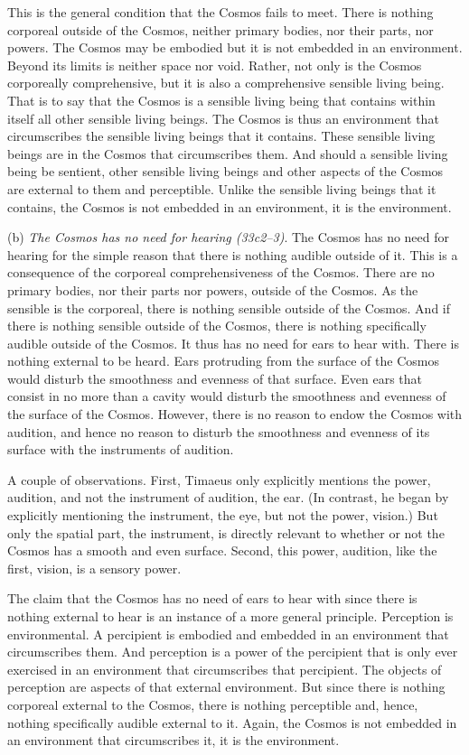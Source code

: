 This is the general condition that the Cosmos fails to meet. There is nothing corporeal outside of the Cosmos, neither primary bodies, nor their parts, nor powers. The Cosmos may be embodied but it is not embedded in an environment. Beyond its limits is neither space nor void. Rather, not only is the Cosmos corporeally comprehensive, but it is also a comprehensive sensible living being. That is to say that the Cosmos is a sensible living being that contains within itself all other sensible living beings. The Cosmos is thus an environment that circumscribes the sensible living beings that it contains. These sensible living beings are in the Cosmos that circumscribes them. And should a sensible living being be sentient, other sensible living beings and other aspects of the Cosmos are external to them and perceptible. Unlike the sensible living beings that it contains, the Cosmos is not embedded in an environment, it is the environment.

(b) \emph{The Cosmos has no need for hearing (33c2–3)}. The Cosmos has no need for hearing for the simple reason that there is nothing audible outside of it. This is a consequence of the corporeal comprehensiveness of the Cosmos. There are no primary bodies, nor their parts nor powers, outside of the Cosmos. As the sensible is the corporeal, there is nothing sensible outside of the Cosmos. And if there is nothing sensible outside of the Cosmos, there is nothing specifically audible outside of the Cosmos. It thus has no need for ears to hear with. There is nothing external to be heard. Ears protruding from the surface of the Cosmos would disturb the smoothness and evenness of that surface. Even ears that consist in no more than a cavity would disturb the smoothness and evenness of the surface of the Cosmos. However, there is no reason to endow the Cosmos with audition, and hence no reason to disturb the smoothness and evenness of its surface with the instruments of audition.

A couple of observations. First, Timaeus only explicitly mentions the power, audition, and not the instrument of audition, the ear. (In contrast, he began by explicitly mentioning the instrument, the eye, but not the power, vision.) But only the spatial part, the instrument, is directly relevant to whether or not the Cosmos has a smooth and even surface. Second, this power, audition, like the first, vision, is a sensory power.

The claim that the Cosmos has no need of ears to hear with since there is nothing external to hear is an instance of a more general principle. Perception is environmental. A percipient is embodied and embedded in an environment that circumscribes them. And perception is a power of the percipient that is only ever exercised in an environment that circumscribes that percipient. The objects of perception are aspects of that external environment. But since there is nothing corporeal external to the Cosmos, there is nothing perceptible and, hence, nothing specifically audible external to it. Again, the Cosmos is not embedded in an environment that circumscribes it, it is the environment.

